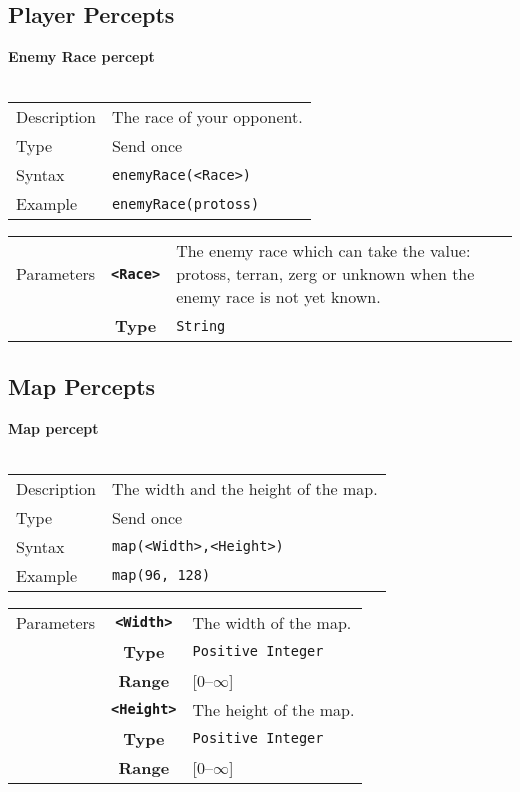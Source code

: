 \subsection{Player Percepts}
\textbf{Enemy Race percept}\\
\\
\begin{tabularx}{\textwidth}{lX}
 Description & The race of your opponent. \\
 Type & Send once \\
 Syntax &  \verb|enemyRace(<Race>)| \\
 Example & \verb|enemyRace(protoss)|   \\ 
 \end{tabularx}
 \begin{tabularx}{\textwidth}{l | c | p{8cm}|}
 \cline{2-3} 
  Parameters & \textbf{\verb|<Race>|} & The enemy race which can take the value: protoss, terran, zerg or unknown                 when the enemy race is not yet known. \\
             & \textbf{Type} & \verb|String| \\
            \cline{2-3} 
\end{tabularx}

\subsection{Map Percepts}
\textbf{Map percept}\\
\\
\begin{tabularx}{\textwidth}{lX}
 Description & The width and the height of the map. \\
 Type & Send once \\
 Syntax & \verb|map(<Width>,<Height>)| \\
 Example & \verb|map(96, 128)| \\   
 \end{tabularx}
 \begin{tabularx}{\textwidth}{l | c | p{8cm}|}
 \cline{2-3} 
  Parameters & \textbf{\verb|<Width>|} & The width of the map.\\
            & \textbf{Type} & \verb|Positive Integer| \\
            & \textbf{Range} & [0--$\infty$] \\
            \cline{2-3} 
            & \textbf{\verb|<Height>|} & The height of the map. \\
            & \textbf{Type} & \verb|Positive Integer| \\
            & \textbf{Range} & [0--$\infty$] \\
            \cline{2-3} 
\end{tabularx}\\
 
